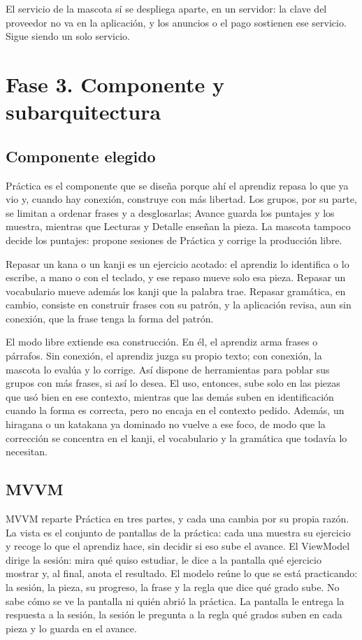 \documentclass[11pt]{article}
\begin{document}
El servicio de la mascota sí se despliega aparte, en un servidor: la clave del proveedor no va en la aplicación, y los anuncios o el pago sostienen ese servicio. Sigue siendo un solo servicio.

\section{Fase 3. Componente y subarquitectura}

\subsection{Componente elegido}

Práctica es el componente que se diseña porque ahí el aprendiz repasa lo que ya vio y, cuando hay conexión, construye con más libertad. Los grupos, por su parte, se limitan a ordenar frases y a desglosarlas; Avance guarda los puntajes y los muestra, mientras que Lecturas y Detalle enseñan la pieza. La mascota tampoco decide los puntajes: propone sesiones de Práctica y corrige la producción libre.

Repasar un kana o un kanji es un ejercicio acotado: el aprendiz lo identifica o lo escribe, a mano o con el teclado, y ese repaso mueve solo esa pieza. Repasar un vocabulario mueve además los kanji que la palabra trae. Repasar gramática, en cambio, consiste en construir frases con su patrón, y la aplicación revisa, aun sin conexión, que la frase tenga la forma del patrón.

El modo libre extiende esa construcción. En él, el aprendiz arma frases o párrafos. Sin conexión, el aprendiz juzga su propio texto; con conexión, la mascota lo evalúa y lo corrige. Así dispone de herramientas para poblar sus grupos con más frases, si así lo desea. El uso, entonces, sube solo en las piezas que usó bien en ese contexto, mientras que las demás suben en identificación cuando la forma es correcta, pero no encaja en el contexto pedido. Además, un hiragana o un katakana ya dominado no vuelve a ese foco, de modo que la corrección se concentra en el kanji, el vocabulario y la gramática que todavía lo necesitan.

\subsection{MVVM}

MVVM reparte Práctica en tres partes, y cada una cambia por su propia razón. La vista es el conjunto de pantallas de la práctica: cada una muestra su ejercicio y recoge lo que el aprendiz hace, sin decidir si eso sube el avance. El ViewModel dirige la sesión: mira qué quiso estudiar, le dice a la pantalla qué ejercicio mostrar y, al final, anota el resultado. El modelo reúne lo que se está practicando: la sesión, la pieza, su progreso, la frase y la regla que dice qué grado sube. No sabe cómo se ve la pantalla ni quién abrió la práctica. La pantalla le entrega la respuesta a la sesión, la sesión le pregunta a la regla qué grados suben en cada pieza y lo guarda en el avance.
\end{document}
